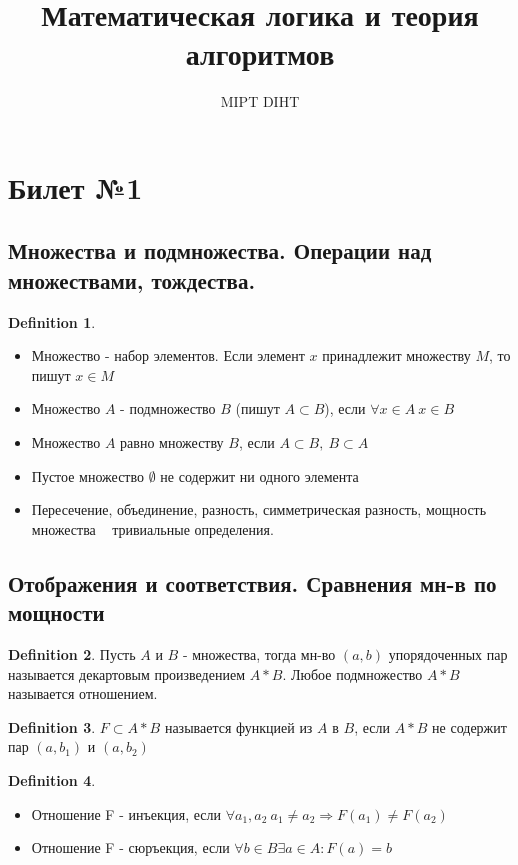 \documentclass[a4paper]{article}
\title{Математическая логика и теория алгоритмов}
\author{MIPT DIHT}
\theoremstyle{plain}
\theoremstyle{remark}
\theoremstyle{definition}
\newtheorem{definition}{Definition}
\begin{document}
\maketitle

\section{Билет №1}
\subsection{Множества и подмножества. Операции над множествами, тождества.}
\begin{definition}
\begin{itemize}
\item Множество - набор элементов. Если элемент $x$ принадлежит множеству $M$, то пишут $x \in M$\\
\item Множество $A$ - подмножество $B$ (пишут $A \subset B$), если $\forall x \in A \ x \in B$
\item Множество $A$ равно множеству $B$, если $A\subset B,\ B\subset A$
\item Пустое множество $\emptyset$ не содержит ни одного элемента
\item Пересечение, объединение, разность, симметрическая разность, мощность множества ~ тривиальные определения.
\end{itemize}
\end{definition}

\subsection{Отображения и соответствия. Сравнения мн-в по мощности}
\begin{definition}
Пусть $A$ и $B$ - множества, тогда мн-во $(a,b)$ упорядоченных пар  называется декартовым произведением $A*B$. Любое подмножество $A*B$ называется отношением.
\end{definition}
\begin{definition}
$F\subset A*B$ называется функцией из $A$ в $B$, если $A*B$ не содержит пар $(a,b_1)$ и $(a,b_2)$
\end{definition}
\begin{definition}
\begin{itemize}
		\item Отношение F - инъекция, если $\forall a_1,a_2\  a_1 \ne a_2\Rightarrow F(a_1)\ne F(a_2)$ 
		\item Отношение F - сюръекция, если $\forall b\in B \exists a \in A: F(a)=b$
	\end{itemize}	
\end{definition}
\end{document}
